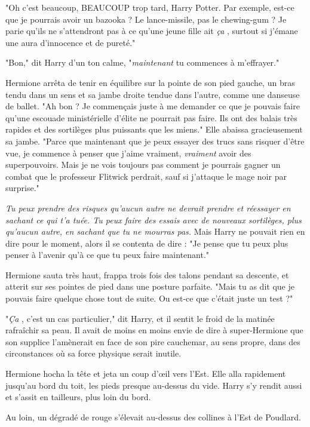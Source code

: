 "Oh c'est beaucoup, BEAUCOUP trop tard, Harry Potter. Par exemple, est-ce que je pourrais avoir un bazooka ? Le lance-missile, pas le chewing-gum ? Je parie qu'ils ne s'attendront pas à ce qu'une jeune fille ait \emph{ça} , surtout si j'émane une aura d'innocence et de pureté."

"Bon," dit Harry d'un ton calme, "\emph{maintenant}  tu commences à m'effrayer."

Hermione arrêta de tenir en équilibre sur la pointe de son pied gauche, un bras tendu dans un sens et sa jambe droite tendue dans l'autre, comme une danseuse de ballet. "Ah bon ? Je commençais juste à me demander ce que je pouvais faire qu'une escouade ministérielle d'élite ne pourrait pas faire. Ils ont des balais très rapides et des sortilèges plus puissants que les miens." Elle abaissa gracieusement sa jambe. "Parce que maintenant que je peux essayer des trucs sans risquer d'être vue, je commence à penser que j'aime vraiment, \emph{vraiment}  avoir des superpouvoirs. Mais je ne vois toujours pas comment je pourrais gagner un combat que le professeur Flitwick perdrait, sauf si j'attaque le mage noir par surprise."

\emph{Tu peux prendre des risques qu'aucun autre ne devrait prendre et réessayer en sachant ce qui t'a tuée. Tu peux faire des essais avec de nouveaux sortilèges, plus qu'aucun autre, en sachant que tu ne mourras pas.}  Mais Harry ne pouvait rien en dire pour le moment, alors il se contenta de dire : "Je pense que tu peux plus penser à l'avenir qu'à ce que tu peux faire maintenant."

Hermione sauta très haut, frappa trois fois des talons pendant sa descente, et atterit sur ses pointes de pied dans une posture parfaite. "Mais tu as dit que je pouvais faire quelque chose tout de suite. Ou est-ce que c'était juste un test ?"

"\emph{Ça} , c'est un cas particulier," dit Harry, et il sentit le froid de la matinée rafraîchir sa peau. Il avait de moins en moins envie de dire à super-Hermione que son supplice l'amènerait en face de son pire cauchemar, au sens propre, dans des circonstances où sa force physique serait inutile.

Hermione hocha la tête et jeta un coup d'œil vers l'Est. Elle alla rapidement jusqu'au bord du toit, les pieds presque au-dessus du vide. Harry s'y rendit aussi et s'assit en tailleurs, plus loin du bord.

Au loin, un dégradé de rouge s'élevait au-dessus des collines à l'Est de Poudlard.

